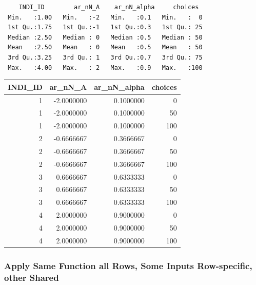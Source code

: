 \documentclass[
]{book}
\newenvironment{Shaded}{\begin{snugshade}}{\end{snugshade}}
\newcommand{\KeywordTok}[1]{\textcolor[rgb]{0.13,0.29,0.53}{\textbf{#1}}}
\newcommand{\NormalTok}[1]{#1}
\newcommand{\OperatorTok}[1]{\textcolor[rgb]{0.81,0.36,0.00}{\textbf{#1}}}
\newcommand{\StringTok}[1]{\textcolor[rgb]{0.31,0.60,0.02}{#1}}
\begin{document}
\begin{verbatim}
    INDI_ID        ar_nN_A    ar_nN_alpha     choices   
 Min.   :1.00   Min.   :-2   Min.   :0.1   Min.   :  0  
 1st Qu.:1.75   1st Qu.:-1   1st Qu.:0.3   1st Qu.: 25  
 Median :2.50   Median : 0   Median :0.5   Median : 50  
 Mean   :2.50   Mean   : 0   Mean   :0.5   Mean   : 50  
 3rd Qu.:3.25   3rd Qu.: 1   3rd Qu.:0.7   3rd Qu.: 75  
 Max.   :4.00   Max.   : 2   Max.   :0.9   Max.   :100  
\end{verbatim}

\begin{Shaded}
\end{Shaded}

\begin{table}[!h]
\centering
\begin{tabular}{r|r|r|r}
\hline
INDI\_ID & ar\_nN\_A & ar\_nN\_alpha & choices\\
\hline
\rowcolor{gray!6}  1 & -2.0000000 & 0.1000000 & 0\\
\hline
1 & -2.0000000 & 0.1000000 & 50\\
\hline
\rowcolor{gray!6}  1 & -2.0000000 & 0.1000000 & 100\\
\hline
2 & -0.6666667 & 0.3666667 & 0\\
\hline
\rowcolor{gray!6}  2 & -0.6666667 & 0.3666667 & 50\\
\hline
2 & -0.6666667 & 0.3666667 & 100\\
\hline
\rowcolor{gray!6}  3 & 0.6666667 & 0.6333333 & 0\\
\hline
3 & 0.6666667 & 0.6333333 & 50\\
\hline
\rowcolor{gray!6}  3 & 0.6666667 & 0.6333333 & 100\\
\hline
4 & 2.0000000 & 0.9000000 & 0\\
\hline
\rowcolor{gray!6}  4 & 2.0000000 & 0.9000000 & 50\\
\hline
4 & 2.0000000 & 0.9000000 & 100\\
\hline
\end{tabular}
\end{table}

\hypertarget{apply-same-function-all-rows-some-inputs-row-specific-other-shared}{%
\subsubsection{Apply Same Function all Rows, Some Inputs Row-specific, other Shared}\label{apply-same-function-all-rows-some-inputs-row-specific-other-shared}}
\end{document}
